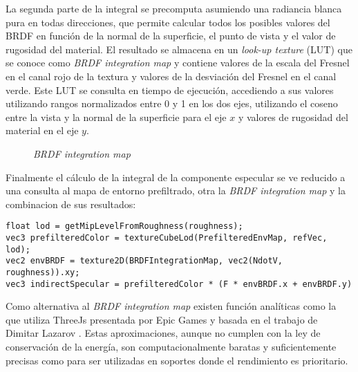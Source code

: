
        La segunda parte de la integral se precomputa asumiendo una radiancia blanca pura en todas direcciones, que permite calcular
        todos los posibles valores del BRDF en funci\'on de la normal de la superficie, el punto de vista y el valor de rugosidad del material.
        El resultado se almacena en un \textit{look-up texture} (LUT) que se conoce como \textit{BRDF integration map} y contiene
        valores de la escala del Fresnel en el canal rojo de la textura y valores de la desviaci\'on del Fresnel en el canal verde.
        Este LUT se consulta en tiempo de ejecuci\'on, accediendo a sus valores utilizando rangos normalizados entre
        0 y 1 en los dos ejes, utilizando el coseno entre la vista y la normal de la superficie para el eje $x$ y valores de rugosidad
        del material en el eje $y$.

        \begin{figure}[H]
            \vspace{0.5cm}
            \centering
            \caption{\textit{BRDF integration map}}
        \end{figure}
        \singlespacing

        
        Finalmente el c\'alculo de la integral de la componente especular se ve reducido a una consulta al mapa de entorno prefiltrado,
        otra la \textit{BRDF integration map} y la combinacion de sus resultados:

        \singlespacing
        \begin{lstlisting}[caption=C\'alculo de la componente especular debida al entorno]
float lod = getMipLevelFromRoughness(roughness);
vec3 prefilteredColor = textureCubeLod(PrefilteredEnvMap, refVec, lod);
vec2 envBRDF = texture2D(BRDFIntegrationMap, vec2(NdotV, roughness)).xy;
vec3 indirectSpecular = prefilteredColor * (F * envBRDF.x + envBRDF.y) 
        \end{lstlisting}
        \singlespacing

        Como alternativa al \textit{BRDF integration map} existen funci\'on anal\'iticas como la que utiliza ThreeJs
        presentada por Epic Games \autocite{dfgapproximation} y basada en el trabajo de
        Dimitar Lazarov \autocite{blackops}. Estas aproximaciones, aunque no cumplen con la ley de conservaci\'on
        de la energ\'ia, son computacionalmente baratas y suficientemente precisas como para ser utilizadas en soportes
        donde el rendimiento es prioritario.
        
